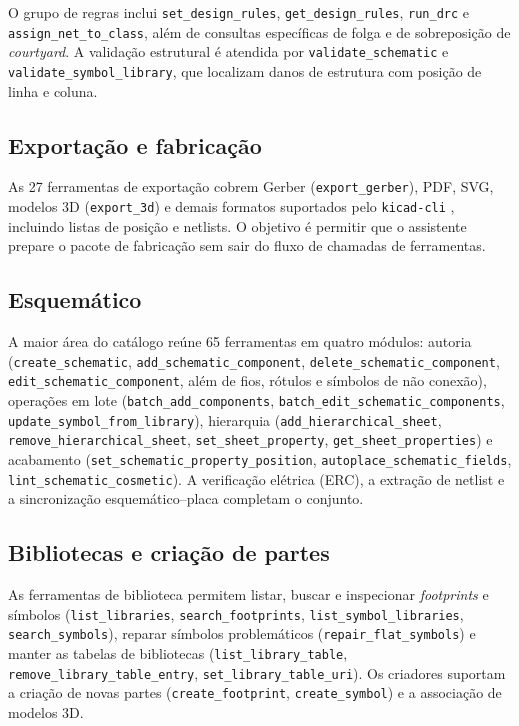 O grupo de regras inclui \texttt{set\_design\_rules},
\texttt{get\_design\_rules}, \texttt{run\_drc} e
\texttt{assign\_net\_to\_class}, além de consultas específicas de folga e de
sobreposição de \emph{courtyard}. A validação estrutural é atendida por
\texttt{validate\_schematic} e \texttt{validate\_symbol\_library}, que
localizam danos de estrutura com posição de linha e coluna.

\subsection{Exportação e fabricação}

As 27 ferramentas de exportação cobrem Gerber (\texttt{export\_gerber}), PDF,
SVG, modelos 3D (\texttt{export\_3d}) e demais formatos suportados pelo
\texttt{kicad-cli} \citep{kicadcli}, incluindo listas de posição e netlists.
O objetivo é permitir que o assistente prepare o pacote de fabricação sem
sair do fluxo de chamadas de ferramentas.

\subsection{Esquemático}

A maior área do catálogo reúne 65 ferramentas em quatro módulos: autoria
(\texttt{create\_schematic}, \texttt{add\_schematic\_component},
\texttt{delete\_schematic\_component}, \texttt{edit\_schematic\_component},
além de fios, rótulos e símbolos de não conexão), operações em lote
(\texttt{batch\_add\_components}, \texttt{batch\_edit\_schematic\_components},
\texttt{update\_symbol\_from\_library}), hierarquia
(\texttt{add\_hierarchical\_sheet}, \texttt{remove\_hierarchical\_sheet},
\texttt{set\_sheet\_property}, \texttt{get\_sheet\_properties}) e acabamento
(\texttt{set\_schematic\_property\_position},
\texttt{autoplace\_schematic\_fields}, \texttt{lint\_schematic\_cosmetic}).
A verificação elétrica (ERC), a extração de netlist e a sincronização
esquemático--placa completam o conjunto.

\subsection{Bibliotecas e criação de partes}

As ferramentas de biblioteca permitem listar, buscar e inspecionar
\emph{footprints} e símbolos (\texttt{list\_libraries},
\texttt{search\_footprints}, \texttt{list\_symbol\_libraries},
\texttt{search\_symbols}), reparar símbolos problemáticos
(\texttt{repair\_flat\_symbols}) e manter as tabelas de bibliotecas
(\texttt{list\_library\_table}, \texttt{remove\_library\_table\_entry},
\texttt{set\_library\_table\_uri}). Os criadores suportam a criação de novas
partes (\texttt{create\_footprint}, \texttt{create\_symbol}) e a associação
de modelos 3D.


